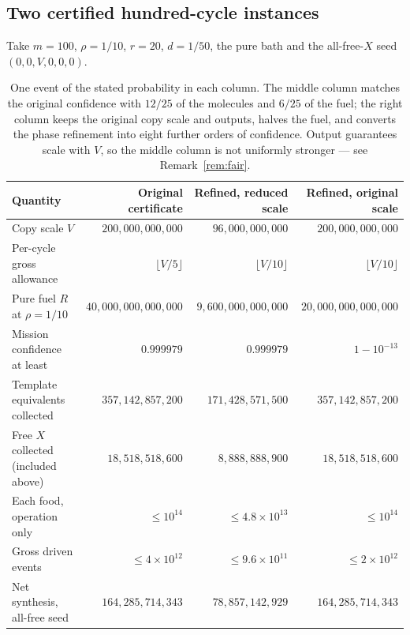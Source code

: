\documentclass[11pt,a4paper]{article}
\theoremstyle{plain}
\theoremstyle{definition}
\theoremstyle{remark}
\begin{document}
\subsection{Two certified hundred-cycle instances}\label{sec:instances}

Take $m=100$, $\rho=1/10$, $r=20$, $d=1/50$, the pure bath and the all-free-$X$ seed $(0,0,V,0,0,0)$.

\begin{table}[tb]
\centering\footnotesize
\setlength{\tabcolsep}{4.5pt}
\begin{tabular}{lrrr}
\toprule
Quantity & Original certificate & Refined, reduced scale & Refined, original scale\\
\midrule
Copy scale $V$ & $200{,}000{,}000{,}000$ & $96{,}000{,}000{,}000$ & $200{,}000{,}000{,}000$\\
Per-cycle gross allowance & $\lfloor V/5\rfloor$ & $\lfloor V/10\rfloor$ & $\lfloor V/10\rfloor$\\
Pure fuel $R$ at $\rho=1/10$ & $40{,}000{,}000{,}000{,}000$ & $9{,}600{,}000{,}000{,}000$ & $20{,}000{,}000{,}000{,}000$\\
Mission confidence at least & $0.999979$ & $0.999979$ & $1-10^{-13}$\\
Template equivalents collected & $357{,}142{,}857{,}200$ & $171{,}428{,}571{,}500$ & $357{,}142{,}857{,}200$\\
Free $X$ collected (included above) & $18{,}518{,}518{,}600$ & $8{,}888{,}888{,}900$ & $18{,}518{,}518{,}600$\\
Each food, operation only & $\le10^{14}$ & $\le4.8\times10^{13}$ & $\le10^{14}$\\
Gross driven events & $\le4\times10^{12}$ & $\le9.6\times10^{11}$ & $\le2\times10^{12}$\\
Net synthesis, all-free seed & $164{,}285{,}714{,}343$ & $78{,}857{,}142{,}929$ & $164{,}285{,}714{,}343$\\
\bottomrule
\end{tabular}
\caption{One event of the stated probability in each column. The middle column matches the original confidence with $12/25$ of the molecules and $6/25$ of the fuel; the right column keeps the original copy scale and outputs, halves the fuel, and converts the phase refinement into eight further orders of confidence. Output guarantees scale with $V$, so the middle column is not uniformly stronger --- see Remark~\ref{rem:fair}.}
\label{tab:instances}
\end{table}
\end{document}

